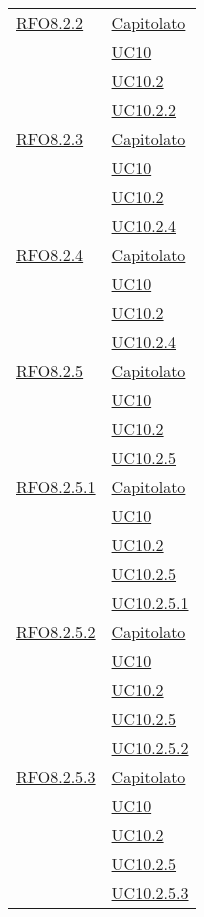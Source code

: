 \begin{longtable}{|>{\centering}m{5cm}|m{5cm}<{\centering}|}
  \hyperlink{RFO8.2.2}{RFO8.2.2} & \hyperlink{Capitolato}{Capitolato}\\
  & \hyperref[UC10]{UC10}\\
  & \hyperref[UC10.2]{UC10.2}\\
  & \hyperref[UC10.2.2]{UC10.2.2}\\\hline
  
  \hyperlink{RFO8.2.3}{RFO8.2.3} & \hyperlink{Capitolato}{Capitolato}\\
  & \hyperref[UC10]{UC10}\\
  & \hyperref[UC10.2]{UC10.2}\\
  & \hyperref[UC10.2.4]{UC10.2.4}\\\hline
  
  \hyperlink{RFO8.2.4}{RFO8.2.4} & \hyperlink{Capitolato}{Capitolato}\\
  & \hyperref[UC10]{UC10}\\
  & \hyperref[UC10.2]{UC10.2}\\
  & \hyperref[UC10.2.4]{UC10.2.4}\\\hline
  
 \hyperlink{RFO8.2.5}{RFO8.2.5} & \hyperlink{Capitolato}{Capitolato}\\
 & \hyperref[UC10]{UC10}\\
 & \hyperref[UC10.2]{UC10.2}\\
 & \hyperref[UC10.2.5]{UC10.2.5}\\\hline
 
 \hyperlink{RFO8.2.5.1}{RFO8.2.5.1} & \hyperlink{Capitolato}{Capitolato}\\
 & \hyperref[UC10]{UC10}\\
 & \hyperref[UC10.2]{UC10.2}\\
 & \hyperref[UC10.2.5]{UC10.2.5}\\
 & \hyperref[UC10.2.5.1]{UC10.2.5.1}\\\hline
 
 \hyperlink{RFO8.2.5.2}{RFO8.2.5.2} & \hyperlink{Capitolato}{Capitolato}\\
 & \hyperref[UC10]{UC10}\\
 & \hyperref[UC10.2]{UC10.2}\\
 & \hyperref[UC10.2.5]{UC10.2.5}\\
 & \hyperref[UC10.2.5.2]{UC10.2.5.2}\\\hline
 
 \hyperlink{RFO8.2.5.3}{RFO8.2.5.3} & \hyperlink{Capitolato}{Capitolato}\\
 & \hyperref[UC10]{UC10}\\
 & \hyperref[UC10.2]{UC10.2}\\
 & \hyperref[UC10.2.5]{UC10.2.5}\\
 & \hyperref[UC10.2.5.3]{UC10.2.5.3}\\\hline
 

\end{longtable}
